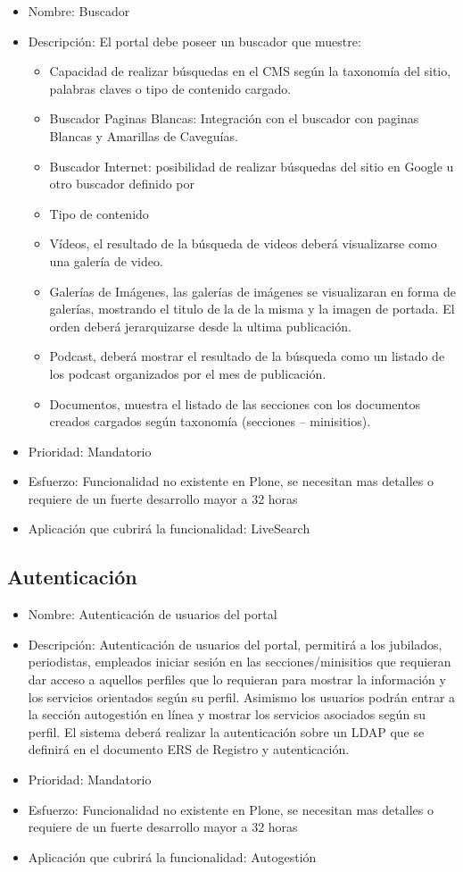 \documentclass[11pt, letterpaper, oneside, spanish]{scrbook}
\begin{document}
\begin{itemize}
\item Nombre: Buscador
\item Descripción: El portal debe poseer un buscador que muestre:
\begin{itemize}
\item Capacidad de realizar búsquedas en el CMS según la taxonomía del sitio,
    palabras claves o tipo de contenido cargado.
\item Buscador Paginas Blancas: Integración con el buscador con paginas Blancas
    y Amarillas de Caveguías.
\item Buscador Internet: posibilidad de realizar búsquedas del sitio en Google u
    otro buscador definido por
\item Tipo de contenido
\item Vídeos, el resultado de la búsqueda de videos deberá visualizarse como una
    galería de video.
\item Galerías de Imágenes, las galerías de imágenes se visualizaran en forma de
    galerías, mostrando el titulo de la de la misma y la imagen de portada. El
    orden deberá jerarquizarse desde la ultima publicación.
\item Podcast, deberá mostrar el resultado de la búsqueda como un listado de los
    podcast organizados por el mes de publicación.
\item Documentos, muestra el listado de las secciones con los documentos creados
    cargados según taxonomía (secciones – minisitios).
\end{itemize}
\item Prioridad: Mandatorio
\item Esfuerzo: Funcionalidad no existente en Plone, se necesitan mas detalles o
  requiere de un fuerte desarrollo mayor a 32 horas
\item Aplicación que cubrirá la funcionalidad: LiveSearch
\end{itemize}
\subsection{Autenticación}
\label{sec-2-1-42}

\begin{itemize}
\item Nombre: Autenticación de usuarios del portal
\item Descripción: Autenticación de usuarios del portal, permitirá a los
  jubilados, periodistas, empleados iniciar sesión en las secciones/minisitios
  que requieran dar acceso a aquellos perfiles que lo requieran para mostrar
  la información y los servicios orientados según su perfil.  Asimismo los
  usuarios podrán entrar a la sección autogestión en línea y mostrar los
  servicios asociados según su perfil. El sistema deberá realizar la
  autenticación sobre un LDAP que se definirá en el documento ERS de Registro
  y autenticación.
\item Prioridad: Mandatorio
\item Esfuerzo: Funcionalidad no existente en Plone, se necesitan mas detalles o
  requiere de un fuerte desarrollo mayor a 32 horas
\item Aplicación que cubrirá la funcionalidad: Autogestión
\end{itemize}
\end{document}
